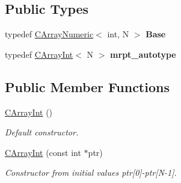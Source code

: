 \subsection*{Public Types}
\begin{DoxyCompactItemize}
\item 
typedef \hyperlink{classydlidar_1_1math_1_1_c_array_numeric}{C\+Array\+Numeric}$<$ int, N $>$ {\bfseries Base}\hypertarget{classydlidar_1_1math_1_1_c_array_int_a4d0afffed8b374d2b0cc18bd7ed530fa}{}\label{classydlidar_1_1math_1_1_c_array_int_a4d0afffed8b374d2b0cc18bd7ed530fa}

\item 
typedef \hyperlink{classydlidar_1_1math_1_1_c_array_int}{C\+Array\+Int}$<$ N $>$ {\bfseries mrpt\+\_\+autotype}\hypertarget{classydlidar_1_1math_1_1_c_array_int_a31054aabc88ae4158cf8f8b1040b3f36}{}\label{classydlidar_1_1math_1_1_c_array_int_a31054aabc88ae4158cf8f8b1040b3f36}

\end{DoxyCompactItemize}
\subsection*{Public Member Functions}
\begin{DoxyCompactItemize}
\item 
\hyperlink{classydlidar_1_1math_1_1_c_array_int_ab6bc1c70b92092ba212948c890daa642}{C\+Array\+Int} ()\hypertarget{classydlidar_1_1math_1_1_c_array_int_ab6bc1c70b92092ba212948c890daa642}{}\label{classydlidar_1_1math_1_1_c_array_int_ab6bc1c70b92092ba212948c890daa642}

\begin{DoxyCompactList}\small\item\em Default constructor. \end{DoxyCompactList}\item 
\hyperlink{classydlidar_1_1math_1_1_c_array_int_a656938b06674af3ec82a8b245f53f2ae}{C\+Array\+Int} (const int $\ast$ptr)\hypertarget{classydlidar_1_1math_1_1_c_array_int_a656938b06674af3ec82a8b245f53f2ae}{}\label{classydlidar_1_1math_1_1_c_array_int_a656938b06674af3ec82a8b245f53f2ae}

\begin{DoxyCompactList}\small\item\em Constructor from initial values ptr\mbox{[}0\mbox{]}-\/ptr\mbox{[}N-\/1\mbox{]}. \end{DoxyCompactList}\end{DoxyCompactItemize}


